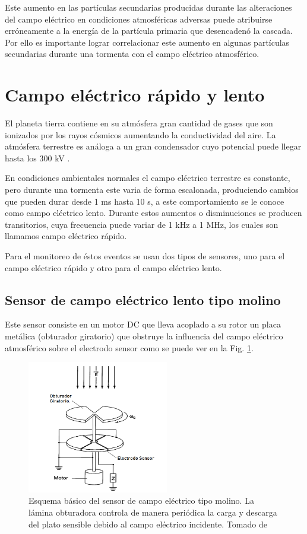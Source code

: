 \documentclass[12pt,a4paper,oneside]{book}
\begin{document}
Este aumento en las partículas secundarias producidas durante las alteraciones del campo eléctrico en condiciones atmosféricas adversas puede atribuirse erróneamente a la energía de la partícula primaria que desencadenó la cascada. Por ello es importante lograr correlacionar este aumento en algunas partículas secundarias durante una tormenta con el campo eléctrico atmosférico.

\section{Campo eléctrico rápido y lento}

El planeta tierra contiene en su atmósfera gran cantidad de gases que son ionizados por los rayos cósmicos aumentando la conductividad del aire. La atmósfera terrestre es análoga a un gran condensador cuyo potencial puede llegar hasta los 300 kV \cite{ogawa1973analyses}.

En condiciones ambientales normales el campo eléctrico terrestre es constante, pero durante una tormenta este varia de forma escalonada, produciendo cambios que pueden durar desde 1 ms hasta 10 s, a este comportamiento se le conoce como campo eléctrico lento. Durante estos aumentos o disminuciones se producen transitorios, cuya frecuencia puede variar de 1 kHz a 1 MHz, los cuales son llamamos campo eléctrico rápido. \medskip

Para el monitoreo de éstos eventos se usan dos tipos de sensores, uno para el campo eléctrico rápido y otro para el campo eléctrico lento. \medskip

\subsection{Sensor de campo eléctrico lento tipo molino}

Este sensor consiste en un motor DC que lleva acoplado a su rotor un placa metálica (obturador giratorio) que obstruye la influencia del campo eléctrico atmosférico sobre el electrodo sensor como se puede ver en la Fig. \ref{figm}.

\begin{figure}[ht]
  \centering
  \includegraphics[width=0.55\textwidth]{Field_Mill.png}
  \caption{ Esquema básico del sensor de campo eléctrico tipo molino. La lámina obturadora controla de manera periódica la carga y descarga del plato sensible debido al campo eléctrico incidente. Tomado de \cite{ibrahim2011measurement} }
  \label{figm}
\end{figure}
\end{document}
